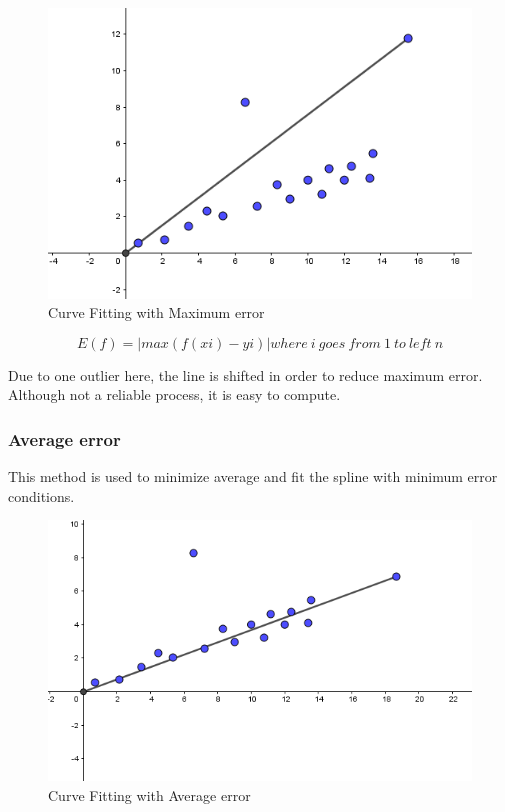 \begin{figure}[!htb]
\includegraphics[width=\textwidth]{./figures/Maxerror.PNG}
\caption{Curve Fitting with Maximum error }
\end{figure}

\begin{equation}
E(f)=|max (f(xi)-yi)|  where\ i\ goes\ from\ 1\ to\ left\ n
\end{equation}

Due to one outlier here, the line is shifted in order to reduce maximum error. Although not a reliable process, it is easy to compute.

\subsubsection{Average error}
This method is used to minimize average and fit the spline with minimum error conditions.

\begin{figure}[!htb]
\includegraphics[width=\textwidth]{./figures/average.PNG}
\caption{Curve Fitting with Average error }
\end{figure}

